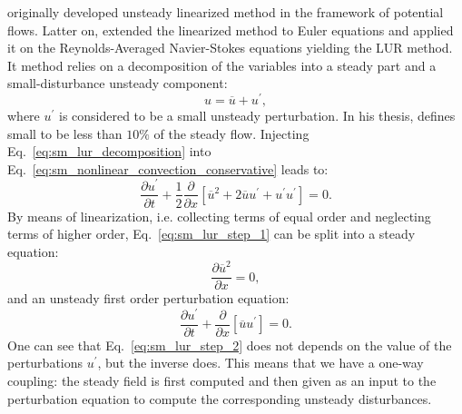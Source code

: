 
\citet{Verdon1984} originally developed unsteady linearized 
method in the framework of potential flows. Latter on, \citet{Hall1989}
extended the linearized method to Euler equations and
\citet{Clark2000} applied it on the Reynolds-Averaged Navier-Stokes equations
yielding the LUR method.
It method relies on a decomposition of the variables
into a steady part and a small-disturbance unsteady component:
\begin{equation}
	u = \overline{u} + u^\prime,
	\label{eq:sm_lur_decomposition}
\end{equation}
where $u^\prime$ is considered to be a small unsteady perturbation. 
In his thesis,
\citet{Hall1987} defines small to be less than $10\%$ of the
steady flow.
Injecting Eq.~\ref{eq:sm_lur_decomposition} into 
Eq.~\ref{eq:sm_nonlinear_convection_conservative} leads to:
\begin{equation}
	\frac{\partial u^\prime}{\partial t} + 
	\frac{1}{2}\frac{\partial}{\partial x} \left[
	\overline{u}^2 + 2 \overline{u} u^\prime + u^\prime u^\prime \right] = 
	0.
	\label{eq:sm_lur_step_1}
\end{equation}
By means of linearization, i.e. collecting terms
of equal order and neglecting terms of higher order, 
Eq.~\ref{eq:sm_lur_step_1} can be split
into a steady equation:
\begin{equation}
	\frac{\partial \overline{u}^2}{\partial x} = 0,
	\label{eq:sm_lur_step_2}
\end{equation}
and an unsteady first order perturbation equation:
\begin{equation}
	\frac{\partial u^\prime}{\partial t} +
	\frac{\partial}{\partial x} \left[
	\overline{u} u^\prime \right] = 
	0.
	\label{eq:sm_lur_step_3}
\end{equation}
One can see that Eq.~\ref{eq:sm_lur_step_2} does not depends
on the value of the perturbations $u^\prime$, but the 
inverse does.
This means that we have a one-way coupling: the steady field
is first computed and then given as an input to the
perturbation equation to compute
the corresponding unsteady disturbances.

